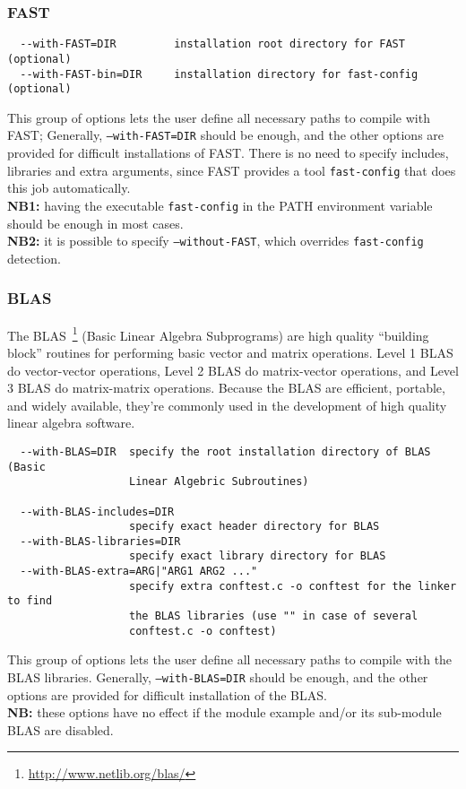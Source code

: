 \subsubsection{FAST}\label{fast_compil}
{\footnotesize
\begin{verbatim}
  --with-FAST=DIR         installation root directory for FAST (optional)
  --with-FAST-bin=DIR     installation directory for fast-config (optional)
\end{verbatim}
}
\noindent This group of options lets the user define all necessary
paths to compile with FAST; Generally, \texttt{--with-FAST=DIR} should
be enough, and the other options are provided for difficult
installations of FAST. There is no need to specify includes, libraries
and extra arguments, since FAST provides a tool \texttt{fast-config}
that does this job automatically.\\ \textbf{NB1:} having the
executable \texttt{fast-config} in the PATH environment variable
should be enough in most cases.\\ \textbf{NB2:} it is possible to
specify \texttt{--without-FAST}, which overrides \texttt{fast-config}
detection.

\subsubsection{BLAS}

The BLAS~\footnote{\url{http://www.netlib.org/blas/}} (Basic Linear
Algebra Subprograms) are high quality ``building block'' routines for
performing basic vector and matrix operations.  Level 1 BLAS do
vector-vector operations, Level 2 BLAS do matrix-vector operations,
and Level 3 BLAS do matrix-matrix operations. Because the BLAS are
efficient, portable, and widely available, they're commonly used in
the development of high quality linear algebra software.

{\footnotesize
\begin{verbatim}
  --with-BLAS=DIR  specify the root installation directory of BLAS (Basic
                   Linear Algebric Subroutines)

  --with-BLAS-includes=DIR
                   specify exact header directory for BLAS
  --with-BLAS-libraries=DIR
                   specify exact library directory for BLAS
  --with-BLAS-extra=ARG|"ARG1 ARG2 ..."
                   specify extra conftest.c -o conftest for the linker to find
                   the BLAS libraries (use "" in case of several 
                   conftest.c -o conftest)
\end{verbatim}
}
\noindent This group of options lets the user define all necessary
paths to compile with the BLAS libraries. Generally,
\texttt{--with-BLAS=DIR} should be enough, and the other options are
provided for difficult installation of the BLAS.\\ \textbf{NB:} these
options have no effect if the module example and/or its sub-module
BLAS are disabled.

